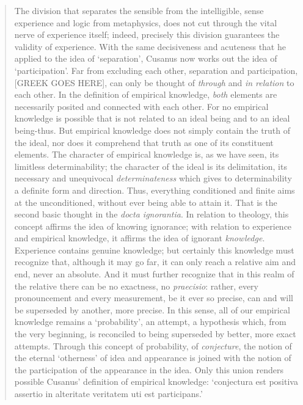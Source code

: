 \begin{quote}
    The division that separates the sensible from the intelligible, sense experience and logic from metaphysics, does not cut through the vital nerve of experience itself; indeed, precisely this division guarantees the validity of experience.  With the same decisiveness and acuteness that he applied to the idea of `separation', Cusanus now works out the idea of `participation'.  Far from excluding each other, separation and participation, [GREEK GOES HERE], can only be thought of \emph{through} and \emph{in relation} to each other.  In the definition of empirical knowledge, \emph{both} elements are necessarily posited and connected with each other.  For no empirical knowledge is possible that is not related to an ideal being and to an ideal being-thus.  But empirical knowledge does not simply contain the truth of the ideal, nor does it comprehend that truth as one of its constituent elements.  The character of empirical knowledge is, as we have seen, its limitless determinability; the character of the ideal is its delimitation, its necessary and unequivocal \emph{determinateness} which gives to determinability a definite form and direction.  Thus, everything conditioned and finite aims at the unconditioned, without ever being able to attain it.  That is the second basic thought in the \emph{docta ignorantia}.  In relation to theology, this concept affirms the idea of knowing ignorance; with relation to experience and empirical knowledge, it affirms the idea of ignorant \emph{knowledge}.  Experience contains genuine knowledge; but certainly this knowledge must recognize that, although it may go far, it can only reach a relative aim and end, never an absolute.  And it must further recognize that in this realm of the relative there can be no exactness, no \emph{praecisio}: rather, every pronouncement and every measurement, be it ever so precise, can and will be superseded by another, more precise.  In this sense, all of our empirical knowledge remains a `probability', an attempt, a hypothesis which, from the very beginning, is reconciled to being superseded by better, more exact attempts.  Through this concept of probability, of \emph{conjecture}, the notion of the eternal `otherness' of idea and appearance is joined with the notion of the participation of the appearance in the idea.  Only this union renders possible Cusanus' definition of empirical knowledge: `conjectura est positiva assertio in alteritate veritatem uti est participans.'  \citep[p. 22-23]{Cassirer1927}
\end{quote}


